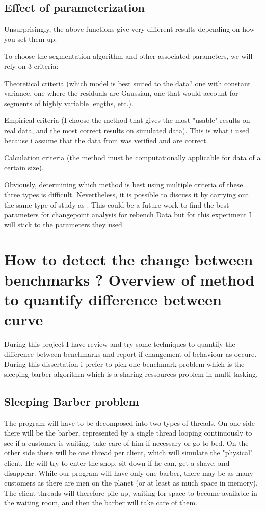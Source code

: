 \documentclass{article}
\begin{document}
\subsection{Effect of parameterization}

Unsurprisingly, the above functions give very different results depending on how you set them up.

To choose the segmentation algorithm and other associated parameters, we will rely on 3 criteria:

Theoretical criteria (which model is best suited to the data? one with constant variance, one where the residuals are Gaussian, one that would account for segments of highly variable lengths, etc.).

Empirical criteria (I choose the method that gives the most "usable" results on real data, and the most correct results on simulated data). This is what i used because i assume that the data from \cite{barrett2017virtual} was verified and are correct.

Calculation criteria (the method must be computationally applicable for data of a certain size).

Obviously, determining which method is best using multiple criteria of these three types is difficult. Nevertheless, it is possible to discuss it by carrying out  the same type of study as \cite{leviandier2012comparison}. This could be a future work to find the best parameters for changepoint analysis for rebench Data but for this experiment I will stick to the parameters they used 





\section{ How to detect the change between benchmarks ? Overview of method to quantify difference between curve}

During this project I have review and try some techniques to quantify the difference between benchmarks and report if changement of behaviour as occure. During this dissertation i prefer to pick one benchmark problem which is the sleeping barber algorithm which is a sharing ressources problem in multi tasking.

\subsection{Sleeping Barber problem}
The program will have to be decomposed into two types of threads. On one side there will be the barber, represented by a single thread looping continuously to see if a customer is waiting, take care of him if necessary or go to bed. On the other side there will be one thread per client, which will simulate the "physical" client. He will try to enter the shop, sit down if he can, get a shave, and disappear.
While our program will have only one barber, there may be as many customers as there are men on the planet (or at least as much space in memory). The client threads will therefore pile up, waiting for space to become available in the waiting room, and then the barber will take care of them.
\end{document}
